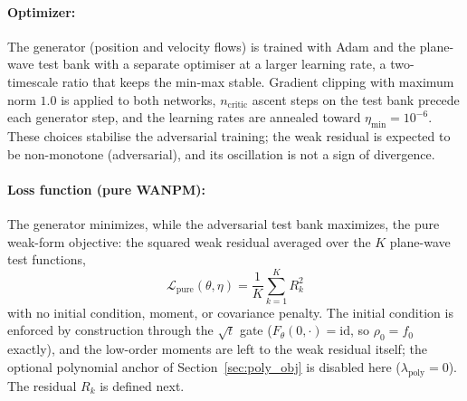 \documentclass[11pt]{article}
\theoremstyle{plain}
\begin{document}

\paragraph{Optimizer:}


The generator (position and velocity flows) is trained with Adam and the plane-wave test bank with a separate optimiser at a larger learning rate, a two-timescale ratio that keeps the min-max stable. Gradient clipping with maximum norm \(1.0\) is applied to both networks, $n_{\mathrm{critic}}$ ascent steps on the test bank precede each generator step, and the learning rates are annealed toward $\eta_{\min}=10^{-6}$. These choices stabilise the adversarial training; the weak residual is expected to be non-monotone (adversarial), and its oscillation is not a sign of divergence.

\paragraph{Loss function (pure WANPM):}

The generator minimizes, while the adversarial test bank maximizes, the pure weak-form objective: the squared weak
residual averaged over the $K$ plane-wave test functions,
\begin{equation}
\boxed{\;\mathcal L_{\mathrm{pure}}(\theta,\eta)
=\frac{1}{K}\sum_{k=1}^{K}R_k^2\;}
\label{eq:wanpm_total_loss}
\end{equation}
with no initial condition, moment, or covariance penalty. The initial condition is enforced by construction through the
$\sqrt t$ gate ($F_\theta(0,\cdot)=\mathrm{id}$, so $\rho_0=f_0$ exactly), and the low-order moments are left to the weak residual itself; the optional polynomial anchor of Section~\ref{sec:poly_obj} is disabled here ($\lambda_{\mathrm{poly}}=0$). The residual $R_k$ is defined next.
\end{document}
